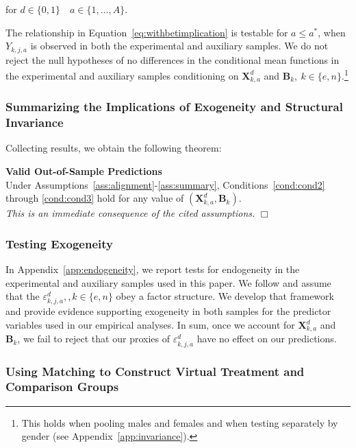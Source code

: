 \noindent for $d \in \{0,1\} \quad  a \in \{1,\dots,A\}$.

The relationship in Equation~\eqref{eq:withbetimplication} is testable for $a \leq a^*$, when $Y_{k,j,a}$ is observed in both the experimental and auxiliary samples. We do not reject the null hypotheses of no differences in the conditional mean functions in the experimental and auxiliary samples conditioning on $\bm{X}_{k,a}^d$ and $\bm{B}_k, \: k \in \{e,n\}$.\footnote{This holds when pooling males and females and when testing separately by gender (see  Appendix~\ref{app:invariance}).}

\subsubsection{Summarizing the Implications of Exogeneity and Structural Invariance}

Collecting results, we obtain the following theorem:

\onehalfspacing
\setcounter{theorem}{0}
\begin{theorem}\label{theorem:main} \textbf{Valid Out-of-Sample Predictions} \\
Under Assumptions~\ref{ass:alignment}-\ref{ass:summary}, Conditions~\ref{cond:cond2} through \ref{cond:cond3} hold for any value of $\left( \bm{X}^d_{k,a}, \bm{B}_k \right)$. \\
\emph{This is an immediate consequence of the cited assumptions.} $\Box$
\end{theorem}
\doublespacing

\subsubsection{Testing Exogeneity}\label{section:accendog}

In  Appendix~\ref{app:endogeneity}, we report tests for endogeneity in the experimental and auxiliary samples used in this paper. We follow \citet{Heckman_Pinto_etal_2013_PerryFactor} and assume that the $\varepsilon_{k,j,a}^d, , k \in \{e,n\}$ obey a factor structure. We develop that framework and provide evidence supporting exogeneity in both samples for the predictor variables used in our empirical analyses. In sum, once we account for $\bm{X}_{k,a}^d$ and $\bm{B}_{k}$, we fail to reject that our proxies of $\varepsilon_{k,j,a}^d$ have no effect on our predictions.

\subsubsection{Using Matching to Construct Virtual Treatment and Comparison Groups}\label{usingmatching}

